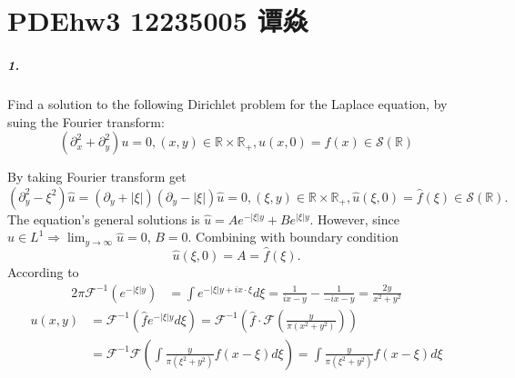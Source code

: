 \documentclass[a4paper]{book}
\makeatletter
\newenvironment{sol}[1][\solname]{\par
  \pushQED{\qed}
  \normalfont \topsep6\p@\@plus6\p@\relax
  \trivlist
  \item[\hskip\labelsep
        \itshape
    #1\@addpunct{.}]\ignorespaces
}{\popQED\endtrivlist\@endpefalse}
\providecommand{\solname}{Solution}
\numberwithin{equation}{chapter}
\theoremstyle{definition}
\makeatother
\begin{document}

\pagestyle{fancy}


\setcounter{chapter}{2}



\chapter*{PDEhw3 12235005 谭焱}
\paragraph*{1. }
Find a solution to the following Dirichlet problem for the 
Laplace equation, by suing the Fourier transform:
\[ (\partial_x^2 + \partial_y^2)u = 0, 
(x,y) \in \mathbb{R} \times \mathbb{R}_+, u(x, 0) = f(x) \in 
\mathcal{S}(\mathbb{R})\]
\begin{sol}
    By taking Fourier transform get 
    \[ (\partial_y^2 - \xi^2)\hat{u} = (\partial_y + |\xi|)(\partial_y - |\xi|)\hat{u} = 0, 
(\xi, y) \in \mathbb{R} \times \mathbb{R}_+, \hat{u}(\xi, 0) = \hat{f}(\xi) \in 
\mathcal{S}(\mathbb{R}).\]
The equation's general solutions is $\hat{u} = A e^{-|\xi|y} +Be^{|\xi|y}$.
However, since $\hat{u} \in L^1 \Rightarrow \lim_{y \rightarrow \infty} \hat{u} = 0$,
$B = 0$. Combining with boundary condition
\[\hat{u}(\xi, 0) = A = \hat{f}(\xi).\]
According to 
\begin{align*}
     2 \pi \mathcal{F}^{-1}(e^{-|\xi|y}) &= \int e^{-|\xi|y + ix \cdot \xi} d\xi
     = \frac{1}{ix - y} - \frac{1}{-ix - y} = \frac{2y}{x^2 + y^2}
\end{align*}
\begin{align*}
    u(x, y) &= \mathcal{F}^{-1} \left( \hat{f} e^{-|\xi|y} d\xi\right) 
    =  \mathcal{F}^{-1} \left( \hat{f} \cdot \mathcal{F} (\frac{y}{\pi(x^2 +y^2)}) \right) \\
    &=\mathcal{F}^{-1} \mathcal{F} \left(\int \frac{y}{\pi(\xi^2 + y^2)} f(x - \xi) d \xi\right)
    =\int \frac{y}{\pi(\xi^2 + y^2)} f(x - \xi) d \xi
\end{align*} 
\end{sol}
\end{document}
